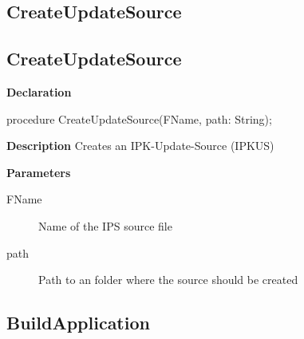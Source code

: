 \documentclass{report}
\newif\ifpdf
\begin{document}
\subsection*{\large{\textbf{CreateUpdateSource}}\normalsize\hspace{1ex}\hrulefill}
\else
\subsection*{CreateUpdateSource}
\fi
\label{ipkbuild-CreateUpdateSource}
\begin{list}{}{
\setlength{\itemindent}{0cm}
\setlength{\listparindent}{0cm}
\setlength{\leftmargin}{\evensidemargin}
\addtolength{\leftmargin}{\tmplength}
\settowidth{\labelsep}{X}
\addtolength{\leftmargin}{\labelsep}
\setlength{\labelwidth}{\tmplength}
}
\item[\textbf{Declaration}\hfill]
\ifpdf
\begin{flushleft}
\fi
\begin{ttfamily}
procedure CreateUpdateSource(FName, path: String);\end{ttfamily}

\ifpdf
\end{flushleft}
\fi

\par
\item[\textbf{Description}]
Creates an IPK{-}Update{-}Source (IPKUS)  \par
\item[\textbf{Parameters}]
\begin{description}
\item[FName] Name of the IPS source file
\item[path] Path to an folder where the source should be created
\end{description}


\end{list}
\ifpdf
\subsection*{\large{\textbf{BuildApplication}}\normalsize\hspace{1ex}\hrulefill}
\else
\end{document}
